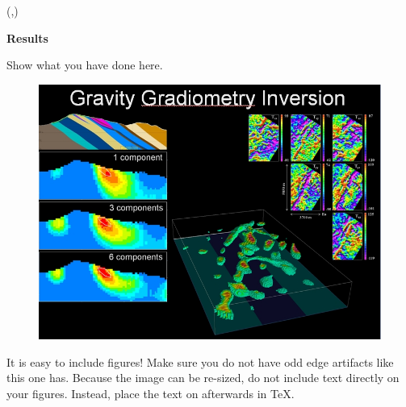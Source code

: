 \documentclass[dark]{cgem-poster}
\begin{document}
\begin{textblock*}{\PosterColumnTwoTextWidth{}}(\PosterColumnTwoTextLeft{},\PosterColumnTwoTextTop{})
  \begin{minipage}[t][\PosterColumnTwoTextHeight{}][t]{\PosterColumnTwoTextWidth{}}
    \vspace{5mm}
    \begin{center}
      \large
      \textbf{Results}
    \end{center}

    \vspace{5mm}
    \small
    Show what you have done here.

    \vspace{20cm}
    \begin{figure}
      \centering
      \includegraphics[width=0.95\PosterColumnTwoTextWidth{}]{YauguoExample}
    \end{figure}

    \vspace{1cm}
    It is easy to include figures! %
    Make sure you do not have odd edge artifacts like this one has. %
    Because the image can be re-sized, do not include text directly on your figures. %
    Instead, place the text on afterwards in \TeX{}.

  \end{minipage}
\end{textblock*}

\newcommand{\PosterColumnThreeTextLeft}{\dimexpr (\PosterColumnThreeLeft + \PosterTextMarginSize)\relax}
\newcommand{\PosterColumnThreeTextWidth}{\dimexpr (\PosterColumnThreeWidth - 2\PosterTextMarginSize)\relax}
\newcommand{\PosterColumnThreeTextTop}{\dimexpr (\PosterColumnThreeTop + \PosterTextMarginSize)\relax}
\newcommand{\PosterColumnThreeTextHeight}{\dimexpr (\PosterColumnThreeHeight - 2\PosterTextMarginSize)\relax}
\end{document}
